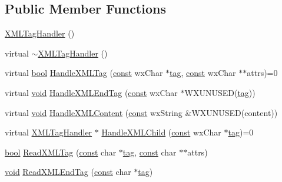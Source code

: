 \subsection*{Public Member Functions}
\begin{DoxyCompactItemize}
\item 
\hyperlink{class_x_m_l_tag_handler_a41758d92758cdaa7c289a66fc2665b1d}{X\+M\+L\+Tag\+Handler} ()
\item 
virtual \hyperlink{class_x_m_l_tag_handler_a40e32f14dfb9f32faa79ec560803e204}{$\sim$\+X\+M\+L\+Tag\+Handler} ()
\item 
virtual \hyperlink{mac_2config_2i386_2lib-src_2libsoxr_2soxr-config_8h_abb452686968e48b67397da5f97445f5b}{bool} \hyperlink{class_x_m_l_tag_handler_aa1891aeb2d34e28a6ee0dd02391039b8}{Handle\+X\+M\+L\+Tag} (\hyperlink{getopt1_8c_a2c212835823e3c54a8ab6d95c652660e}{const} wx\+Char $\ast$\hyperlink{structtag}{tag}, \hyperlink{getopt1_8c_a2c212835823e3c54a8ab6d95c652660e}{const} wx\+Char $\ast$$\ast$attrs)=0
\item 
virtual \hyperlink{sound_8c_ae35f5844602719cf66324f4de2a658b3}{void} \hyperlink{class_x_m_l_tag_handler_af4d7389b5029a37c4b3c665eab464660}{Handle\+X\+M\+L\+End\+Tag} (\hyperlink{getopt1_8c_a2c212835823e3c54a8ab6d95c652660e}{const} wx\+Char $\ast$W\+X\+U\+N\+U\+S\+ED(\hyperlink{structtag}{tag}))
\item 
virtual \hyperlink{sound_8c_ae35f5844602719cf66324f4de2a658b3}{void} \hyperlink{class_x_m_l_tag_handler_a2440581a01bc2dc3a098083fa694c9bf}{Handle\+X\+M\+L\+Content} (\hyperlink{getopt1_8c_a2c212835823e3c54a8ab6d95c652660e}{const} wx\+String \&W\+X\+U\+N\+U\+S\+ED(content))
\item 
virtual \hyperlink{class_x_m_l_tag_handler}{X\+M\+L\+Tag\+Handler} $\ast$ \hyperlink{class_x_m_l_tag_handler_ad37304e1f592a76a9dd80b5455db741b}{Handle\+X\+M\+L\+Child} (\hyperlink{getopt1_8c_a2c212835823e3c54a8ab6d95c652660e}{const} wx\+Char $\ast$\hyperlink{structtag}{tag})=0
\item 
\hyperlink{mac_2config_2i386_2lib-src_2libsoxr_2soxr-config_8h_abb452686968e48b67397da5f97445f5b}{bool} \hyperlink{class_x_m_l_tag_handler_ae4ca0c0282252907d45b65a1ba099fd1}{Read\+X\+M\+L\+Tag} (\hyperlink{getopt1_8c_a2c212835823e3c54a8ab6d95c652660e}{const} char $\ast$\hyperlink{structtag}{tag}, \hyperlink{getopt1_8c_a2c212835823e3c54a8ab6d95c652660e}{const} char $\ast$$\ast$attrs)
\item 
\hyperlink{sound_8c_ae35f5844602719cf66324f4de2a658b3}{void} \hyperlink{class_x_m_l_tag_handler_a9e5ffb1c69cf9f5e3168bcefc89d2462}{Read\+X\+M\+L\+End\+Tag} (\hyperlink{getopt1_8c_a2c212835823e3c54a8ab6d95c652660e}{const} char $\ast$\hyperlink{structtag}{tag})

\end{DoxyCompactItemize}
